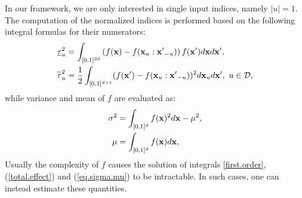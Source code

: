 In our framework, we are only interested in single input indices, namely $|u|=1$. The computation of the normalized indices is performed based on the following integral formulas for their numerators:
\begin{align}
\label{first.order}
\underline{\tau}_u^2  &= \int_{[0,1]^{2d}} \left(f(\vx)-
f(\vx_u:{\vx'}_{-u})\right)f(\vx')d\vx d{\vx'}, \\
\label{total.effect}
\ov{$\tau$}_u^2 &= \frac{1}{2}\int_{[0,1]^{d+1}}(f(\vx')-f(\vx_u:{\vx'}_{-u}))^2 d\vx_u d{\vx'}, \ u \in \mathcal{D},
\end{align}
while variance and mean of $f$ are evaluated as:
\begin{gather}
\begin{aligned}
\sigma^2 &= \int_{[0,1]^{d}} f(\boldsymbol{\mathbf{x}})^2d{\boldsymbol{\mathbf{x}}} - \mu^2, \\
 \mu &= \int_{[0,1]^{d}} f(\boldsymbol{\mathbf{x}}) d{\boldsymbol{\mathbf{x}}},
\label{eq.sigma.mu}
\end{aligned}
\end{gather}
Usually the complexity of $f$ causes the solution of integrals \eqref{first.order}, (\ref{total.effect}) and (\ref{eq.sigma.mu}) to be intractable. In such cases, one can instead estimate these quantities.

